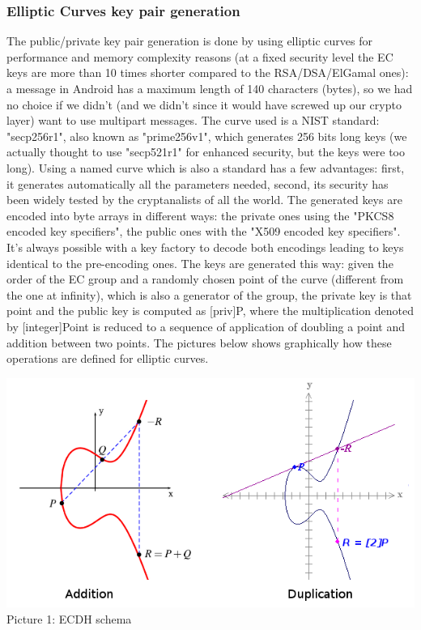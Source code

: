\subsubsection{Elliptic Curves key pair generation}
The public/private key pair generation is done by using elliptic curves for performance and memory complexity reasons (at a fixed security level the EC keys are more than 10 times shorter compared to the RSA/DSA/ElGamal ones): a message in Android has a maximum length of 140 characters (bytes), so we had no choice if we didn't (and we didn't since it would have screwed up our crypto layer) want to use multipart messages. The curve used is a NIST standard: "secp256r1", also known as "prime256v1", which generates 256 bits long keys (we actually thought to use "secp521r1" for enhanced security, but the keys were too long). Using a named curve which is also a standard has a few advantages: first, it generates automatically all the parameters needed, second, its security has been widely tested by the cryptanalists of all the world. The generated keys are encoded into byte arrays in different ways: the private ones using the "PKCS8 encoded key specifiers", the public ones with the "X509 encoded key specifiers". It's always possible with a key factory to decode both encodings leading to keys identical to the pre-encoding ones. The keys are generated this way: given the order of the EC group and a randomly chosen point of the curve (different from the one at infinity), which is also a generator of the group, the private key is that point and the public key is computed as [priv]P, where the multiplication denoted by [integer]Point is reduced to a sequence of application of doubling a point and addition between two points. The pictures below shows graphically how these operations are defined for elliptic curves.\\

\vspace{1cm}
\begin{center}
\includegraphics[scale=0.7]{images/ec}\\

\vspace{1cm}
Picture 1: ECDH schema\\
\end{center}